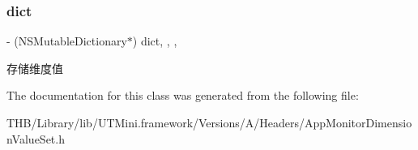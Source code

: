 \subsubsection{\texorpdfstring{dict}{dict}}
{\footnotesize\ttfamily -\/ (N\+S\+Mutable\+Dictionary$\ast$) dict\hspace{0.3cm}{\ttfamily [read]}, {\ttfamily [write]}, {\ttfamily [nonatomic]}, {\ttfamily [strong]}}

存储维度值 

The documentation for this class was generated from the following file\+:\begin{DoxyCompactItemize}
\item 
T\+H\+B/\+Library/lib/\+U\+T\+Mini.\+framework/\+Versions/\+A/\+Headers/App\+Monitor\+Dimension\+Value\+Set.\+h\end{DoxyCompactItemize}
